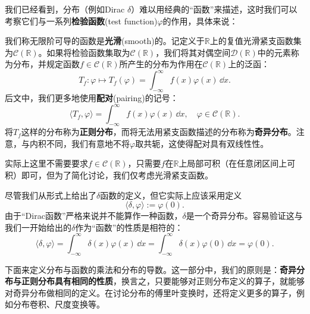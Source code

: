 我们已经看到，分布（例如Dirac $\delta$）难以用经典的“函数”来描述，这时我们可以考察它们与一系列\textbf{检验函数}(test function)$\varphi$的作用，具体来说：
\begin{definition}[分布]
    我们称无限阶可导的函数是\textbf{光滑}(smooth)的。记定义于$\mathbb{R}$上的复值光滑紧支函数集为$\mathcal{C}(\mathbb{R})$。如果将检验函数集取为$\mathcal{C}(\mathbb{R})$，我们将其对偶空间$\mathcal{D}(\mathbb{R})$中的元素称为分布，并规定函数$f\in \mathcal{C}(\mathbb{R})$所产生的分布为作用在$\mathcal{C}(\mathbb{R})$上的泛函：
    \begin{equation}
        T_f:\varphi\mapsto T_f(\varphi)=\int_{-\infty}^{\infty}f(x)\varphi(x)\,\dd x.
    \end{equation}
    后文中，我们更多地使用\textbf{配对}(pairing)的记号：
    \begin{equation}
        \langle T_f,\varphi\rangle=\int_{-\infty}^{\infty}f(x)\varphi(x)\,\dd x,\quad \varphi\in\mathcal{C}(\mathbb{R}).
    \end{equation}
    将$T_f$这样的分布称为\textbf{正则分布}，而将无法用紧支函数描述的分布称为\textbf{奇异分布}。注意，与内积不同，我们有意地不将$\varphi$取共轭，这使得配对具有双线性性。
\end{definition}
\begin{remark}
    实际上这里不需要要求$f\in\mathcal{C}(\mathbb{R})$，只需要$f$在$\mathbb{R}$上局部可积（在任意闭区间上可积）即可，但为了简化讨论，我们仅考虑光滑紧支函数。
\end{remark}
\begin{example}
    尽管我们从形式上给出了$\delta$函数的定义，但它实际上应该采用定义
    \begin{equation}
        \langle \delta,\varphi\rangle:=\varphi(0).
    \end{equation}
    由于“Dirac函数”严格来说并不能算作一种函数，$\delta$是一个奇异分布。容易验证这与我们一开始给出的$\delta$作为“函数”的性质是相符的：
    \begin{equation}
        \langle \delta,\varphi\rangle=\int_{-\infty}^{\infty}\delta(x)\varphi(x)\,\dd x=\int_{-\infty}^{\infty}\delta(x)\varphi(0)\,\dd x=\varphi(0).
    \end{equation}
\end{example}

下面来定义分布与函数的乘法和分布的导数。这一部分中，我们的原则是：\textbf{奇异分布与正则分布具有相同的性质}，换言之，只要能够对正则分布定义的算子，就能够对奇异分布做相同的定义。在讨论分布的傅里叶变换时，还将定义更多的算子，例如分布卷积、尺度变换等。

